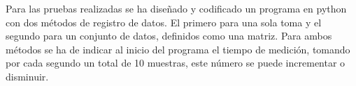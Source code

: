 
Para las pruebas realizadas se ha diseñado y codificado un programa en python con dos métodos de registro de datos. El primero para una sola toma y el segundo para un conjunto de datos, definidos como una matriz. Para ambos métodos se ha de indicar al inicio del programa el tiempo de medición, tomando por cada segundo un total de 10 muestras, este número se puede incrementar o disminuir.


